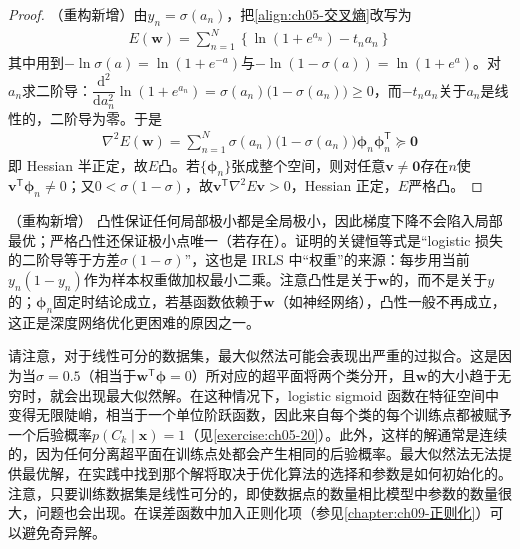 \documentclass[../../main.tex]{subfiles}
\begin{document}
\begin{proof}
（重构新增）由$y_n=\sigma(a_n)$，把\eqref{align:ch05-交叉熵}改写为
\begin{align}
  E(\boldsymbol{w})=\sum_{n=1}^{N}\left\{\ln\left(1+e^{a_n}\right)-t_na_n\right\}
\end{align}
其中用到$-\ln\sigma(a)=\ln(1+e^{-a})$与$-\ln(1-\sigma(a))=\ln(1+e^{a})$。对$a_n$求二阶导：$\dfrac{\mathrm{d}^{2}}{\mathrm{d}a_n^{2}}\ln(1+e^{a_n})=\sigma(a_n)\bigl(1-\sigma(a_n)\bigr)\geqslant 0$，而$-t_na_n$关于$a_n$是线性的，二阶导为零。于是
\begin{align}
  \nabla^{2}E(\boldsymbol{w})=\sum_{n=1}^{N}\sigma(a_n)\bigl(1-\sigma(a_n)\bigr)\boldsymbol{\phi}_n\boldsymbol{\phi}_n^{\mathsf{T}}\succeq\boldsymbol{0}
\end{align}
即 Hessian 半正定，故$E$凸。若$\{\boldsymbol{\phi}_n\}$张成整个空间，则对任意$\boldsymbol{v}\neq\boldsymbol{0}$存在$n$使$\boldsymbol{v}^{\mathsf{T}}\boldsymbol{\phi}_n\neq0$；又$0<\sigma(1-\sigma)$，故$\boldsymbol{v}^{\mathsf{T}}\nabla^{2}E\boldsymbol{v}>0$，Hessian 正定，$E$严格凸。
\end{proof}

\begin{remark}（重构新增）
凸性保证任何局部极小都是全局极小，因此梯度下降不会陷入局部最优；严格凸性还保证极小点唯一（若存在）。证明的关键恒等式是“logistic 损失的二阶导等于方差$\sigma(1-\sigma)$”，这也是 IRLS 中“权重”的来源：每步用当前$y_n(1-y_n)$作为样本权重做加权最小二乘。注意凸性是关于$\boldsymbol{w}$的，而不是关于$y$的；$\boldsymbol{\phi}_n$固定时结论成立，若基函数依赖于$\boldsymbol{w}$（如神经网络），凸性一般不再成立，这正是深度网络优化更困难的原因之一。
\end{remark}

请注意，对于线性可分的数据集，最大似然法可能会表现出严重的过拟合。这是因为当$\sigma=0.5$（相当于$\boldsymbol{w}^{\mathsf{T}}\boldsymbol{\phi}=0$）所对应的超平面将两个类分开，且$\boldsymbol{w}$的大小趋于无穷时，就会出现最大似然解。在这种情况下，logistic sigmoid 函数在特征空间中变得无限陡峭，相当于一个单位阶跃函数，因此来自每个类的每个训练点都被赋予一个后验概率$p(C_k\mid\boldsymbol{x})=1$（见\cref{exercise:ch05-20}）。此外，这样的解通常是连续的，因为任何分离超平面在训练点处都会产生相同的后验概率。最大似然法无法提供最优解，在实践中找到那个解将取决于优化算法的选择和参数是如何初始化的。注意，只要训练数据集是线性可分的，即使数据点的数量相比模型中参数的数量很大，问题也会出现。在误差函数中加入正则化项（参见\cref{chapter:ch09-正则化}）可以避免奇异解。
\end{document}
